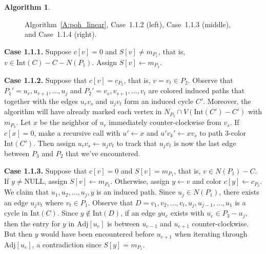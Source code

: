 \documentclass[12pt,letterpaper]{article}
\theoremstyle{plain}
\theoremstyle{definition}
\theoremstyle{break}
\newtheorem{algorithm}[lemma]{Algorithm}     %
\begin{document}
\begin{algorithm}
\begin{figure}[ht]
\begin{center}
\caption{Algorithm~\ref{A:poh_linear}, Case~1.1.2 (left), Case~1.1.3 (middle),
and Case~1.1.4 (right).}\label{F:poh_linear_1}
\end{center}
\end{figure}

\textbf{Case 1.1.1.} Suppose $c[v]=0$ and $S[v]\ne m_{P_1}$, that is,
$v\in\text{Int}(C)-C-N(P_1)$. Assign $S[v]\leftarrow m_{P_3}$.

\textbf{Case 1.1.2.} Suppose that $c[v]=c_{P_2}$, that is, $v=v_t\in P_2$.
Observe that $P_1'=u_r,u_{r+1},\ldots, u_j$ and $P_2'=v_s,v_{s+1},\ldots,v_t$
are colored induced paths that together with the edges $u_rv_s$ and $u_jv_t$
form an induced cycle $C'$. Moreover, the algorithm will have already marked
each vertex in $N_{P_3}\cap V(\text{Int}(C')-C')$ with $m_{P_3}$.
Let
$x$ be the neighbor of $u_r$ immediately counter-clockwise from $v_s$.
If $c[x]=0$, make a recursive call with $u'\leftarrow x$ and
$u'v_k'\leftarrow xv_s$ to path $3$-color $\text{Int}(C')$. Then assign
$u_rv_s\leftarrow u_jv_t$ to track that $u_jv_t$ is now the last edge between
$P_3$ and $P_2$ that we've encountered.

\textbf{Case 1.1.3.} Suppose that $c[v]=0$ and $S[v]=m_{P_1}$, that is,
$v\in N(P_1)-C$. If $y\ne\text{NULL}$, assign $S[v]\leftarrow m_{P_3}$.
Otherwise, assign $y\leftarrow v$ and color
$c[y]\leftarrow c_{P_3}$. We claim that $u_1,u_2,\ldots,u_j,y$ is an induced
path. Since $u_j\in N(P_1)$, there exists an edge $u_jv_t$ where $v_t\in P_1$.
Observe that $D=v_1,v_2,\ldots,v_t,u_j,u_{j-1},\ldots,u_1$ is a cycle in
$\text{Int}(C)$. Since $y\not\in\text{Int}(D)$, if an edge $yu_e$ exists with
$u_e\in P_3-u_j$,
then the entry for $y$ in $\text{Adj}[u_e]$ is between $u_{e-1}$ and
$u_{e+1}$ counter-clockwise.
But then $y$ would have been encountered before $u_{e+1}$
when iterating through $\text{Adj}[u_e]$, a contradiction since
$S[y]=m_{P_1}$.


\end{algorithm}
\end{document}
